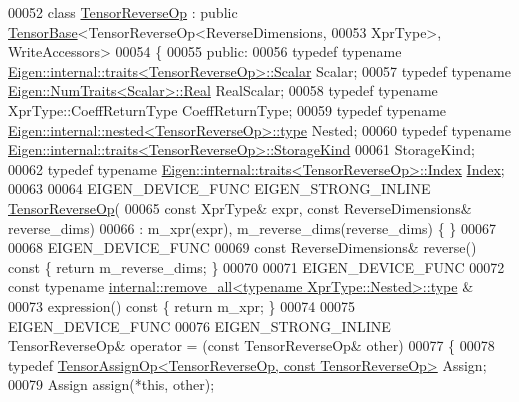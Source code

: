 \begin{DoxyCode}
00052 \textcolor{keyword}{class }\hyperlink{class_eigen_1_1_tensor_reverse_op}{TensorReverseOp} : \textcolor{keyword}{public} \hyperlink{class_eigen_1_1_tensor_base}{TensorBase}<TensorReverseOp<ReverseDimensions,
00053                                           XprType>, WriteAccessors>
00054 \{
00055   \textcolor{keyword}{public}:
00056   \textcolor{keyword}{typedef} \textcolor{keyword}{typename} \hyperlink{struct_eigen_1_1internal_1_1traits}{Eigen::internal::traits<TensorReverseOp>::Scalar}
       Scalar;
00057   \textcolor{keyword}{typedef} \textcolor{keyword}{typename} \hyperlink{group___sparse_core___module}{Eigen::NumTraits<Scalar>::Real} RealScalar;
00058   \textcolor{keyword}{typedef} \textcolor{keyword}{typename} XprType::CoeffReturnType CoeffReturnType;
00059   \textcolor{keyword}{typedef} \textcolor{keyword}{typename} \hyperlink{class_eigen_1_1internal_1_1_tensor_lazy_evaluator_writable}{Eigen::internal::nested<TensorReverseOp>::type}
       Nested;
00060   \textcolor{keyword}{typedef} \textcolor{keyword}{typename} \hyperlink{struct_eigen_1_1internal_1_1traits}{Eigen::internal::traits<TensorReverseOp>::StorageKind}
00061                                                                     StorageKind;
00062   \textcolor{keyword}{typedef} \textcolor{keyword}{typename} \hyperlink{struct_eigen_1_1internal_1_1traits}{Eigen::internal::traits<TensorReverseOp>::Index}
       \hyperlink{namespace_eigen_a62e77e0933482dafde8fe197d9a2cfde}{Index};
00063 
00064   EIGEN\_DEVICE\_FUNC EIGEN\_STRONG\_INLINE \hyperlink{class_eigen_1_1_tensor_reverse_op}{TensorReverseOp}(
00065       \textcolor{keyword}{const} XprType& expr, \textcolor{keyword}{const} ReverseDimensions& reverse\_dims)
00066       : m\_xpr(expr), m\_reverse\_dims(reverse\_dims) \{ \}
00067 
00068     EIGEN\_DEVICE\_FUNC
00069     \textcolor{keyword}{const} ReverseDimensions& reverse()\textcolor{keyword}{ const }\{ \textcolor{keywordflow}{return} m\_reverse\_dims; \}
00070 
00071     EIGEN\_DEVICE\_FUNC
00072     \textcolor{keyword}{const} \textcolor{keyword}{typename} \hyperlink{group___sparse_core___module}{internal::remove\_all<typename XprType::Nested>::type}
      &
00073     expression()\textcolor{keyword}{ const }\{ \textcolor{keywordflow}{return} m\_xpr; \}
00074 
00075     EIGEN\_DEVICE\_FUNC
00076     EIGEN\_STRONG\_INLINE TensorReverseOp& operator = (\textcolor{keyword}{const} TensorReverseOp& other)
00077     \{
00078       \textcolor{keyword}{typedef} \hyperlink{class_eigen_1_1_tensor_assign_op}{TensorAssignOp<TensorReverseOp, const TensorReverseOp>}
       Assign;
00079       Assign assign(*\textcolor{keyword}{this}, other);

\end{DoxyCode}
